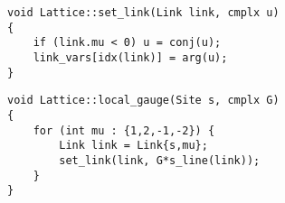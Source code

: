 \begin{lstlisting}[caption={Link updating}]
void Lattice::set_link(Link link, cmplx u)
{
    if (link.mu < 0) u = conj(u);
    link_vars[idx(link)] = arg(u);
}
\end{lstlisting}

\begin{lstlisting}[caption={Local gauge transform}]
void Lattice::local_gauge(Site s, cmplx G)
{
    for (int mu : {1,2,-1,-2}) {
        Link link = Link{s,mu};
        set_link(link, G*s_line(link));
    }
}
\end{lstlisting}


